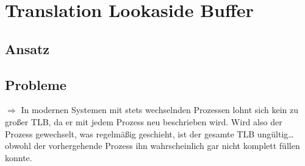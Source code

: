 \section{Translation Lookaside Buffer}


\subsection{Ansatz}

\subsection{Probleme}
$\Rightarrow$ In modernen Systemen mit stets wechselnden Prozessen lohnt sich kein zu großer TLB, da er mit jedem Prozess neu beschrieben wird. Wird also der Prozess gewechselt, was regelmäßig geschieht, ist der gesamte TLB ungültig… obwohl der vorhergehende Prozess ihn wahrscheinlich gar nicht komplett füllen konnte.